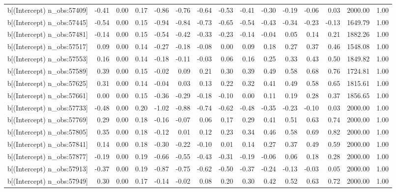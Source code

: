 \begin{table}[ht]
\begin{tabular}{rrrrrrrrrrrrrrr}
  b[(Intercept) n\_obs:57409] & -0.41 & 0.00 & 0.17 & -0.86 & -0.76 & -0.64 & -0.53 & -0.41 & -0.30 & -0.19 & -0.06 & 0.03 & 2000.00 & 1.00 \\ 
  b[(Intercept) n\_obs:57445] & -0.54 & 0.00 & 0.15 & -0.94 & -0.84 & -0.73 & -0.65 & -0.54 & -0.43 & -0.34 & -0.23 & -0.13 & 1649.79 & 1.00 \\ 
  b[(Intercept) n\_obs:57481] & -0.14 & 0.00 & 0.15 & -0.54 & -0.42 & -0.33 & -0.23 & -0.14 & -0.04 & 0.05 & 0.14 & 0.21 & 1882.26 & 1.00 \\ 
  b[(Intercept) n\_obs:57517] & 0.09 & 0.00 & 0.14 & -0.27 & -0.18 & -0.08 & 0.00 & 0.09 & 0.18 & 0.27 & 0.37 & 0.46 & 1548.08 & 1.00 \\ 
  b[(Intercept) n\_obs:57553] & 0.16 & 0.00 & 0.14 & -0.18 & -0.11 & -0.03 & 0.06 & 0.16 & 0.25 & 0.33 & 0.43 & 0.50 & 1849.82 & 1.00 \\ 
  b[(Intercept) n\_obs:57589] & 0.39 & 0.00 & 0.15 & -0.02 & 0.09 & 0.21 & 0.30 & 0.39 & 0.49 & 0.58 & 0.68 & 0.76 & 1724.81 & 1.00 \\ 
  b[(Intercept) n\_obs:57625] & 0.31 & 0.00 & 0.14 & -0.04 & 0.03 & 0.13 & 0.22 & 0.32 & 0.41 & 0.49 & 0.58 & 0.65 & 1815.61 & 1.00 \\ 
  b[(Intercept) n\_obs:57661] & 0.00 & 0.00 & 0.15 & -0.36 & -0.29 & -0.18 & -0.10 & 0.00 & 0.11 & 0.19 & 0.28 & 0.37 & 1856.65 & 1.00 \\ 
  b[(Intercept) n\_obs:57733] & -0.48 & 0.00 & 0.20 & -1.02 & -0.88 & -0.74 & -0.62 & -0.48 & -0.35 & -0.23 & -0.10 & 0.03 & 2000.00 & 1.00 \\ 
  b[(Intercept) n\_obs:57769] & 0.29 & 0.00 & 0.18 & -0.16 & -0.07 & 0.06 & 0.17 & 0.29 & 0.41 & 0.51 & 0.63 & 0.74 & 2000.00 & 1.00 \\ 
  b[(Intercept) n\_obs:57805] & 0.35 & 0.00 & 0.18 & -0.12 & 0.01 & 0.12 & 0.23 & 0.34 & 0.46 & 0.58 & 0.69 & 0.82 & 2000.00 & 1.00 \\ 
  b[(Intercept) n\_obs:57841] & 0.14 & 0.00 & 0.18 & -0.30 & -0.22 & -0.10 & 0.01 & 0.14 & 0.27 & 0.37 & 0.49 & 0.59 & 2000.00 & 1.00 \\ 
  b[(Intercept) n\_obs:57877] & -0.19 & 0.00 & 0.19 & -0.66 & -0.55 & -0.43 & -0.31 & -0.19 & -0.06 & 0.06 & 0.18 & 0.28 & 2000.00 & 1.00 \\ 
  b[(Intercept) n\_obs:57913] & -0.37 & 0.00 & 0.19 & -0.87 & -0.75 & -0.62 & -0.50 & -0.37 & -0.24 & -0.13 & -0.03 & 0.05 & 2000.00 & 1.00 \\ 
  b[(Intercept) n\_obs:57949] & 0.30 & 0.00 & 0.17 & -0.14 & -0.02 & 0.08 & 0.20 & 0.30 & 0.42 & 0.52 & 0.63 & 0.72 & 2000.00 & 1.00 \\ 

\end{tabular}
\end{table}
